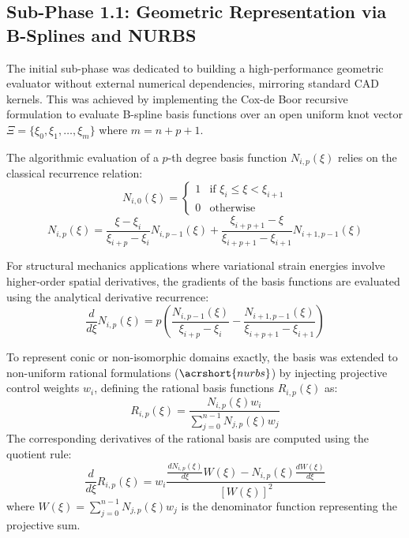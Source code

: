 \subsection{Sub-Phase 1.1: Geometric Representation via B-Splines and NURBS}
\label{subsec:nurbs_mapping}

The initial sub-phase was dedicated to building a high-performance geometric evaluator without external numerical dependencies, mirroring standard CAD kernels. This was achieved by implementing the Cox-de Boor recursive formulation to evaluate B-spline basis functions over an open uniform knot vector $\Xi = \{\xi_0, \xi_1, \dots, \xi_{m}\}$ where $m = n + p + 1$.

The algorithmic evaluation of a $p$-th degree basis function $N_{i,p}(\xi)$ relies on the classical recurrence relation:
\begin{equation}
N_{i,0}(\xi) = \begin{cases} 1 & \text{if } \xi_i \le \xi < \xi_{i+1} \\ 0 & \text{otherwise} \end{cases}
\end{equation}
\begin{equation}
N_{i,p}(\xi) = \frac{\xi - \xi_i}{\xi_{i+p} - \xi_i} N_{i,p-1}(\xi) + \frac{\xi_{i+p+1} - \xi}{\xi_{i+p+1} - \xi_{i+1}} N_{i+1,p-1}(\xi)
\end{equation}

For structural mechanics applications where variational strain energies involve higher-order spatial derivatives, the gradients of the basis functions are evaluated using the analytical derivative recurrence:
\begin{equation}
\frac{d}{d\xi} N_{i,p}(\xi) = p \left( \frac{N_{i,p-1}(\xi)}{\xi_{i+p} - \xi_i} - \frac{N_{i+1,p-1}(\xi)}{\xi_{i+p+1} - \xi_{i+1}} \right)
\end{equation}

To represent conic or non-isomorphic domains exactly, the basis was extended to non-uniform rational formulations ($\acrshort{nurbs}$) by injecting projective control weights $w_i$, defining the rational basis functions $R_{i,p}(\xi)$ as:
\begin{equation}
R_{i,p}(\xi) = \frac{N_{i,p}(\xi) w_i}{\sum_{j=0}^{n-1} N_{j,p}(\xi) w_j}
\end{equation}
The corresponding derivatives of the rational basis are computed using the quotient rule:
\begin{equation}
\frac{d}{d\xi} R_{i,p}(\xi) = w_i \frac{\frac{d N_{i,p}(\xi)}{d\xi} W(\xi) - N_{i,p}(\xi) \frac{d W(\xi)}{d\xi}}{[W(\xi)]^2}
\end{equation}
where $W(\xi) = \sum_{j=0}^{n-1} N_{j,p}(\xi) w_j$ is the denominator function representing the projective sum.

